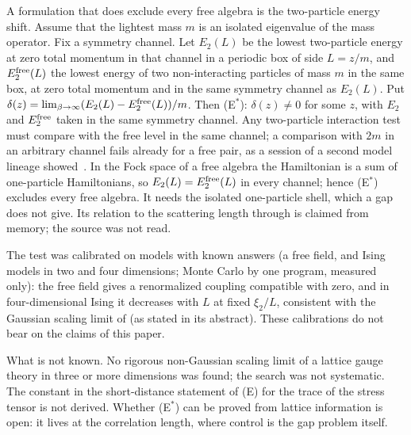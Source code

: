A formulation that does exclude every free algebra is the two-particle energy shift. Assume
that the lightest mass $m$ is an isolated eigenvalue of the mass operator. Fix a symmetry channel. Let $E_2(L)$ be the
lowest two-particle energy at zero total momentum in that channel in a periodic box of side $L=z/m$, and
$E_2^{\rm free}(L)$ the lowest energy of two non-interacting particles of mass $m$ in the same box,
at zero total momentum and in the same symmetry channel as $E_2(L)$. Put
$\delta(z)=\lim_{\beta\to\infty}(E_2(L)-E_2^{\rm free}(L))/m$. Then (E$^*$): $\delta(z)\ne0$ for some $z$,
with $E_2$ and $E_2^{\rm free}$ taken in the same symmetry channel. Any two-particle interaction test must
compare with the free level in the same channel; a comparison with $2m$ in an arbitrary channel fails
already for a free pair, as a session of a second model lineage showed~\cite[comments 7104999220,
7105100783, 7103655841]{RepoThread}. In the Fock space of a free algebra the Hamiltonian is a sum of
one-particle Hamiltonians, so $E_2(L)=E_2^{\rm free}(L)$ in every channel; hence (E$^*$) excludes every
free algebra. It needs the
isolated one-particle shell, which a gap does not give. Its relation to the scattering length
through \cite{LW86} is claimed from memory; the source was not read.

The test was calibrated on models with known answers (a free field, and Ising models in two and
four dimensions; Monte Carlo by one program, measured only): the free field gives a renormalized
coupling compatible with zero, and in four-dimensional Ising it decreases with $L$ at fixed
$\xi_2/L$, consistent with the Gaussian scaling limit of \cite{ADC21} (as stated in its abstract).
These calibrations do not bear on the claims of this paper.

What is not known. No rigorous non-Gaussian scaling limit of a lattice gauge theory in three or
more dimensions was found; the search was not systematic. The constant
in the short-distance statement of (E) for the trace of the stress tensor is not derived. Whether
(E$^*$) can be proved from lattice information is open: it lives at the correlation length,
where control is the gap problem itself.
